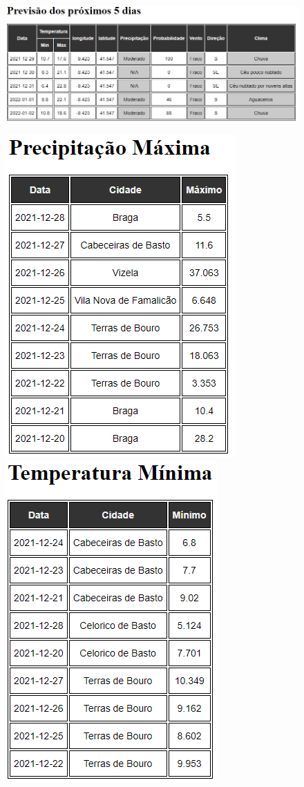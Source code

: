 \begin{figure}[H]
    \centering
    \includegraphics[scale=0.6]{imagens-spoon/email_previsao.png}
\end{figure}
\begin{figure}[H]
    \centering
    \includegraphics[scale=0.7]{imagens-spoon/email_precipitacao.png}
    \includegraphics[scale=0.7]{imagens-spoon/email_temperatura-minima.png}

\end{figure}
